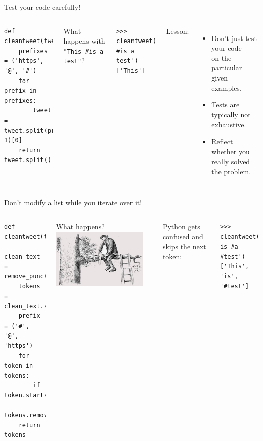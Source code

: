 \documentclass[aspectratio=169,usenames,dvipsnames]{beamer}
\begin{document}
\begin{frame}[fragile]{Test your code carefully!}
    \begin{columns}[T]
\begin{lstlisting}[style=smaller]
def cleantweet(tweet):
    prefixes = ('https', '@', '#')
    for prefix in prefixes:
        tweet = tweet.split(prefix, 1)[0]
    return tweet.split()
\end{lstlisting}
What happens with \lstinline|"This #is a test"|?
\pause
\begin{lstlisting}[style=smaller]
>>> cleantweet('This #is a test')
['This']
\end{lstlisting}
\pause{}
Lesson:
    \begin{itemize}
        \item Don't just test your code \\
            on the particular given examples.
        \item Tests are typically not exhaustive.
        \item Reflect whether you really solved the problem.
    \end{itemize}
\end{columns}
\end{frame}

\begin{frame}[fragile]{Don't modify a list while you iterate over it!}
\begin{columns}
\begin{lstlisting}[style=smaller]
def cleantweet(text):
    clean_text = remove_punc(text)
    tokens = clean_text.split()
    prefix = ('#', '@', 'https')
    for token in tokens:
        if token.startswith(prefix):
            tokens.remove(token)
    return tokens
\end{lstlisting}

What happens?
\pause{}
\includegraphics[width=0.9\textwidth]{fig/branch}

\vspace{1em}
Python gets confused and skips the next token:
\begin{lstlisting}[style=smaller]
>>> cleantweet('This is #a #test')
['This', 'is', '#test']
\end{lstlisting}
\end{columns}
\end{frame}
\end{document}
